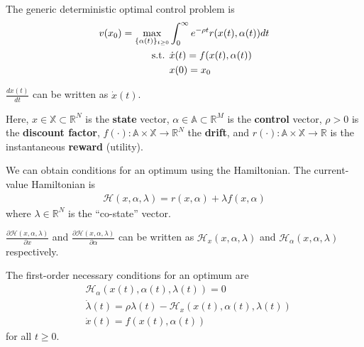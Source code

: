 \documentclass[11pt]{elegantbook}
\begin{document}
\begin{definition}
    The generic deterministic optimal control problem is
    \begin{equation}
        \begin{aligned}
            v(x_0)=\max_{\{\alpha(t)\}_{t\geq 0}}&\int_0^\infty e^{-\rho t}r(x(t),\alpha(t))dt\\
            \textnormal{s.t. }&\dot{x}(t)=f(x(t),\alpha(t))\\
            &x(0)=x_0
        \end{aligned}
        \nonumber
    \end{equation}
    \begin{note}
        $\frac{dx(t)}{dt}$ can be written as $\dot{x}(t)$.
    \end{note}
    Here, $x\in\mathbb{X}\subset \mathbb{R}^N$ is the \textbf{state} vector, $\alpha\in \mathbb{A}\subset \mathbb{R}^M$ is the \textbf{control} vector, $\rho>0$ is the \textbf{discount factor}, $f(\cdot):\mathbb{A}\times \mathbb{X} \rightarrow \mathbb{R}^N$ the \textbf{drift}, and $r(\cdot):\mathbb{A}\times \mathbb{X} \rightarrow \mathbb{R}$ is the instantaneous \textbf{reward} (utility).
\end{definition}
We can obtain conditions for an optimum using the Hamiltonian.
The current-value Hamiltonian is
    \begin{equation}
        \begin{aligned}
            \mathcal{H}(x,\alpha,\lambda)=r(x,\alpha)+\lambda f(x,\alpha)
        \end{aligned}
        \nonumber
    \end{equation}
    where $\lambda\in \mathbb{R}^N$ is the ``co-state'' vector.
\begin{note}
    $\frac{\partial\mathcal{H}(x,\alpha,\lambda)}{\partial x}$ and $\frac{\partial\mathcal{H}(x,\alpha,\lambda)}{\partial \alpha}$ can be written as $\mathcal{H}_x(x,\alpha,\lambda)$ and $\mathcal{H}_\alpha(x,\alpha,\lambda)$ respectively.
\end{note}
\begin{proposition}
    The first-order necessary conditions for an optimum are
    \begin{equation}
        \begin{aligned}
            &\mathcal{H}_\alpha(x(t),\alpha(t),\lambda(t))=0\\
            &\dot{\lambda}(t)=\rho\lambda(t)-\mathcal{H}_x(x(t),\alpha(t),\lambda(t))\\
            &\dot{x}(t)=f(x(t),\alpha(t))
        \end{aligned}
        \nonumber
    \end{equation}
    for all $t\geq 0$.
\end{proposition}
\end{document}
